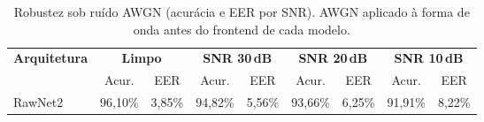 \begin{table}[H]
\centering
\caption{Robustez sob ruído AWGN (acurácia e EER por SNR). AWGN aplicado à forma de onda antes do frontend de cada modelo.}
\label{tab:bench_robustez}
\small\singlespacing
\begin{tabular}{lcccccccc}
\toprule
\multirow{2}{*}{\textbf{Arquitetura}} & \multicolumn{2}{c}{\textbf{Limpo}} & \multicolumn{2}{c}{\textbf{SNR 30\,dB}} & \multicolumn{2}{c}{\textbf{SNR 20\,dB}} & \multicolumn{2}{c}{\textbf{SNR 10\,dB}} \\
\cmidrule(lr){2-3}\cmidrule(lr){4-5}\cmidrule(lr){6-7}\cmidrule(lr){8-9}
 & Acur. & EER & Acur. & EER & Acur. & EER & Acur. & EER \\
\midrule
RawNet2 & 96,10\% & 3,85\% & 94,82\% & 5,56\% & 93,66\% & 6,25\% & 91,91\% & 8,22\% \\
\bottomrule
\end{tabular}
\end{table}
